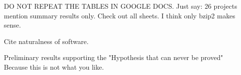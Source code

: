 
DO NOT REPEAT THE TABLES IN GOOGLE DOCS.
Just say: 26 projects mention summary results only.
Check out all sheets. I think only bzip2 makes sense.

Cite naturalness of software.

Preliminary results supporting the 
"Hypothesis that can never be proved"
Because this is not what you like.

